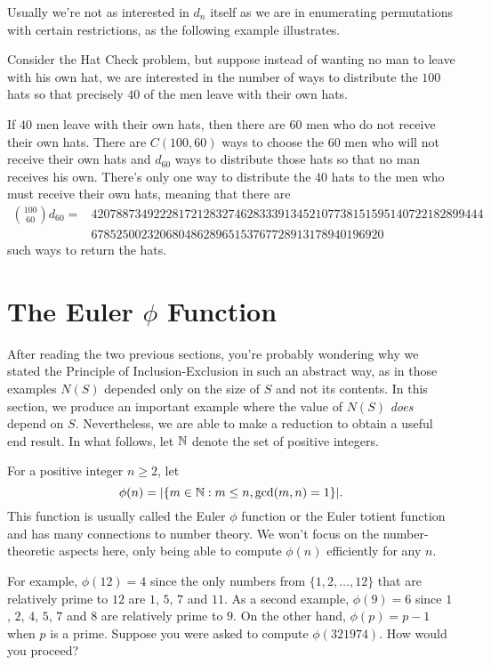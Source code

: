 Usually we're not as interested in $d_n$ itself as we are in
enumerating permutations with certain restrictions, as the following
example illustrates.

\begin{example}
  Consider the Hat Check problem, but suppose instead of wanting no
  man to leave with his own hat, we are interested in the number of
  ways to distribute the $100$ hats so that precisely $40$ of the men
  leave with their own hats.

  If $40$ men leave with their own hats, then there are $60$ men who
  do not receive their own hats. There are $C(100,60)$ ways to choose
  the $60$ men who will not receive their own hats and $d_{60}$ ways
  to distribute those hats so that no man receives his own. There's
  only one way to distribute the $40$ hats to the men who must receive
  their own hats, meaning that there are
  \begin{align*}
    \binom{100}{60}d_{60} =
    &420788734922281721283274628333913452107738151595140722182899444\\
    &67852500232068048628965153767728913178940196920
    \end{align*}
  such ways to return the hats.
\end{example}

\section{The Euler $\phi$ Function}\label{s:inclusion-exclusion:euler-phi}

After reading the two previous sections, you're probably wondering why
we stated the Principle of Inclusion-Exclusion in such an abstract
way, as in those examples $N(S)$ depended only on the size of $S$ and
not its contents. In this section, we produce an important example
where the value of $N(S)$ \textit{does} depend on $S$.
Nevertheless, we are able to make a reduction to obtain a useful end
result.  In what follows, let $\mathbb{N}$ denote the set of positive
integers.

For a positive integer $n\ge2$, let 
\[
\phi(n)=|\{m\in \mathbb{N}: m\le n, \gcd(m,n)=1\}|.
\]
This function is usually called the Euler $\phi$ function or the Euler
totient function and has many connections to number theory. We won't
focus on the number-theoretic aspects here, only being able to compute
$\phi(n)$ efficiently for any $n$.

For example, $\phi(12)=4$ since the only numbers from $\{1,2,\dots,12\}$
that are relatively prime to $12$ are $1$, $5$, $7$ and $11$. As a
second example, $\phi(9)=6$ since $1$, $2$, $4$, $5$, $7$ and $8$ are
relatively prime to $9$.  On the other hand, $\phi(p)=p-1$ when $p$ is 
a prime.  Suppose you were asked to compute $\phi(321974)$.  How
would you proceed?

